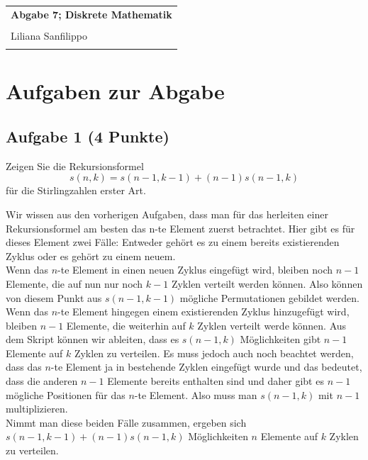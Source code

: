 \documentclass{article} %
\newcommand{\titulo}{Abgabe 7; Diskrete Mathematik}
\newcommand{\nombre}{Liliana Sanfilippo}
\begin{document}
\begin{tabular}{p{12cm}}
{{\Large\bf\titulo}}\\
\vspace{0.2cm}\\
 {\large\nombre}\\
 \vspace{0.2cm}\\   
\end{tabular}

\section*{Aufgaben zur Abgabe}

    \subsection*{Aufgabe 1 (4 Punkte)}
    Zeigen Sie die Rekursionsformel 
    \[
    s(n, k) = s(n - 1, k - 1) + (n - 1)s(n - 1, k)
    \]
    für die Stirlingzahlen erster Art.
    \begin{mybox}
    Wir wissen aus den vorherigen Aufgaben, dass man für das herleiten einer Rekursionsformel am besten das n-te Element zuerst betrachtet. Hier gibt es für dieses Element zwei Fälle: Entweder gehört es zu einem bereits existierenden Zyklus oder es gehört zu einem neuem. \\
    Wenn das $n$-te Element in einen neuen Zyklus eingefügt wird, bleiben noch $n-1$ Elemente, die auf nun nur noch $k-1$ Zyklen verteilt werden können. Also können von diesem Punkt aus $s(n - 1, k - 1)$ mögliche Permutationen gebildet werden. \\
    Wenn das $n$-te Element hingegen einem existierenden Zyklus hinzugefügt wird, bleiben $n-1$ Elemente, die weiterhin auf $k$ Zyklen verteilt werde können. Aus dem Skript können wir ableiten, dass es $s(n-1,k)$ Möglichkeiten gibt $n-1$ Elemente auf $k$ Zyklen zu verteilen. Es muss jedoch auch noch beachtet werden, dass das $n$-te Element ja in bestehende Zyklen eingefügt wurde und das bedeutet, dass die anderen $n-1$ Elemente bereits enthalten sind und daher gibt es $n-1$ mögliche Positionen für das $n$-te Element. Also muss man $s(n-1,k)$ mit $n-1$ multiplizieren.  \\
   Nimmt man diese beiden Fälle zusammen, ergeben sich  $s(n - 1, k - 1) + (n - 1)s(n - 1, k)$ Möglichkeiten $n$ Elemente auf $k$ Zyklen zu verteilen. 
    \end{mybox}
\end{document}
